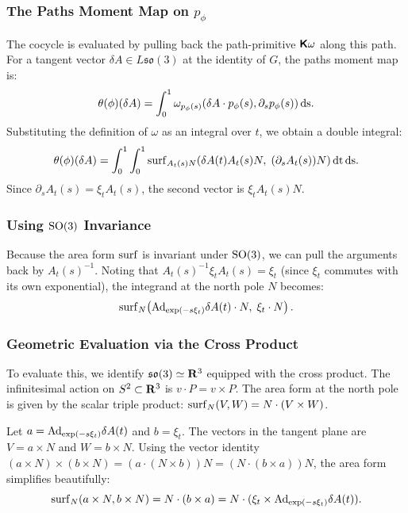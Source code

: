 \documentclass[11pt,reqno,letterpaper,twoside]{amsart}
\begin{document}
  \subsubsection{The Paths Moment Map on $p_\phi$}
  The cocycle is evaluated by pulling back the path-primitive $\boldsymbol{\mathsf{K}}\omega$ along this path.
  For a tangent vector $\delta A \in L\mathfrak{so}(3)$ at the identity of $G$,
  the paths moment map is:
  \[
    \theta(\phi)(\delta A) = \int_0^1 \omega_{p_\phi(s)}(\delta A \cdot p_\phi(s), \partial_s p_\phi(s)) \, \mathrm{ds}.
    \]
  Substituting the definition of $\omega$ as an integral over $t$,
  we obtain a double integral:
  \[
    \theta(\phi)(\delta A) = \int_0^1 \int_0^1 \operatorname{surf}_{A_t(s) N}\!\left( \delta A(t) A_t(s) N, \; (\partial_s A_t(s)) N \right) \mathrm{dt} \, \mathrm{ds}.
    \]
  Since $\partial_s A_t(s) = \xi_t A_t(s)$,
  the second vector is $\xi_t A_t(s) N$.
  
  \subsubsection{Using $\mathrm{SO}(3)$ Invariance}
  Because the area form $\operatorname{surf}$ is invariant under $\mathrm{SO}(3)$,
  we can pull the arguments back by $A_t(s)^{-1}$.
  Noting that $A_t(s)^{-1} \xi_t A_t(s) = \xi_t$ (since $\xi_t$ commutes with its own exponential),
  the integrand at the north pole $N$ becomes:
  \[
    \operatorname{surf}_N\!\left( \mathrm{Ad}_{\exp(-s \xi_t)} \delta A(t) \cdot N, \; \xi_t \cdot N \right).
    \]
  
  \subsubsection{Geometric Evaluation via the Cross Product}
  To evaluate this,
  we identify $\mathfrak{so}(3) \simeq {\mathbf{R}}^3$ equipped with the cross product.
  The infinitesimal action on $S^2 \subset {\mathbf{R}}^3$ is $v \cdot P = v \times P$.
  The area form at the north pole is given by the scalar triple product: $\operatorname{surf}_N(V, W) = N \cdot (V \times W)$.
  
  Let $a = \mathrm{Ad}_{\exp(-s \xi_t)} \delta A(t)$ and $b = \xi_t$.
  The vectors in the tangent plane are $V = a \times N$ and $W = b \times N$.
  Using the vector identity $(a \times N) \times (b \times N) = (a \cdot (N \times b))N = (N \cdot (b \times a))N$,
  the area form simplifies beautifully:
  \[
    \operatorname{surf}_N(a \times N, b \times N) = N \cdot (b \times a) = N \cdot (\xi_t \times \mathrm{Ad}_{\exp(-s \xi_t)} \delta A(t)).
    \]
  
\end{document}
